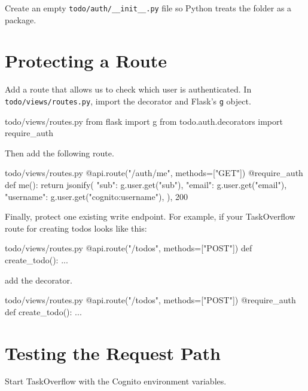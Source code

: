 \documentclass{csse4400}
\begin{document}
Create an empty \texttt{todo/auth/\_\_init\_\_.py} file so Python treats the folder as a package.

\section{Protecting a Route}

Add a route that allows us to check which user is authenticated.
In \texttt{todo/views/routes.py}, import the decorator and Flask's \texttt{g} object.

\begin{code}[language=python,numbers=none]{todo/views/routes.py}
from flask import g
from todo.auth.decorators import require_auth
\end{code}

Then add the following route.

\begin{code}[language=python,numbers=none]{todo/views/routes.py}
@api.route("/auth/me", methods=["GET"])
@require_auth
def me():
    return jsonify({
        "sub": g.user.get("sub"),
        "email": g.user.get("email"),
        "username": g.user.get("cognito:username"),
    }), 200
\end{code}

Finally, protect one existing write endpoint.
For example, if your TaskOverflow route for creating todos looks like this:

\begin{code}[language=python,numbers=none]{todo/views/routes.py}
@api.route("/todos", methods=["POST"])
def create_todo():
    ...
\end{code}

\noindent
add the decorator.

\begin{code}[language=python,numbers=none]{todo/views/routes.py}
@api.route("/todos", methods=["POST"])
@require_auth
def create_todo():
    ...
\end{code}


\section{Testing the Request Path}

Start TaskOverflow with the Cognito environment variables.
\end{document}
